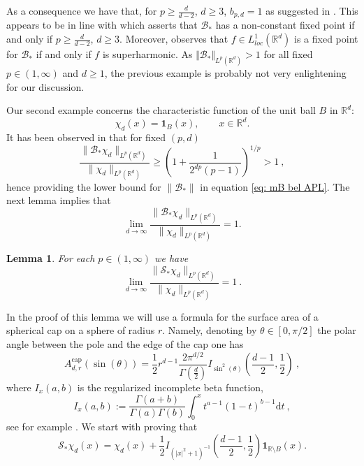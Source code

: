\documentclass[a4paper, reqno]{amsart}
\newtheorem{lemma}[thm]{Lemma}
\theoremstyle{definition}
\newcommand{\R}{{\mathbb R}}
\newcommand{\dd}{{\mathrm d}}
\newcommand{\mB}{\mathcal{B}}
\begin{document}
As a consequence we have that, for $p\geq \frac{d}{d-2}$, $d\geq 3$, $b_{p,d}=1$ as suggested in \cite{DSS}.  This appears to be in line with \cite[Theorem~1]{K01} which asserts that $\mB_\ast$ has a non-constant fixed point if and only if $p\geq \frac{d}{d-2}$, $d\geq 3$. Moreover, \cite[Remark~1]{K01} observes that $f\in L^1_{loc}(\mathbb{R}^d)$ is a fixed point for $\mB_\ast$ if and only if $f$ is superharmonic.
As $\Vert\mathcal{B}_\ast \Vert_{L^p(\mathbb{R}^d)}>1$ for all fixed $p\in (1,\infty)$ and $d\geq 1$, the previous example is probably not very enlightening for our discussion. 

 Our second example concerns the characteristic function of the unit ball $B$ in $\R^d:$ 
 \[\chi_d(x)=\mathbf{1}_{B}(x),\qquad x\in \R^d.\] It has been observed in \cite[Remark 2.9]{APL} that for fixed $(p,d)$
\begin{equation*}
\frac{\|\mB_{*}\chi_d\|_{L^p(\R^d)}}{\|\chi_d \|_{L^p(\R^d)}}\ge \left(1+\frac{1}{2^{dp}(p-1)}\right)^{1/p} >1~,
\end{equation*}
hence providing the lower bound for $\|\mathcal{B}_\ast\|$ in equation \eqref{eq: mB bel APL}. The next lemma implies that
\[
\lim_{d\to \infty} \frac{\|\mB_{*}\chi_d\|_{L^p(\R^d)}}{\|\chi_d \|_{L^p(\R^d)}}=1.
\]
\begin{lemma}
\label{lem: spher ball}
   For each $p\in(1,\infty)$ we have
    $$\lim_{d\rightarrow\infty}\frac{\|\mathcal{S}_\ast \chi_d\|_{L^p(\R^d)}}{\|\chi_d\|_{L^p(\R^d)}}=1~.$$
\end{lemma}
In the proof of this lemma we will use a formula for the surface area of a spherical cap on a sphere of radius $r.$ Namely, denoting by $\theta\in[0,\pi/2]$  the polar angle between the pole and the edge of the cap one has
\begin{equation}
\label{eq: Adr form}
A_{d,r}^{\text{cap}}(\sin(\theta))=\frac{1}{2}r^{d-1}\frac{2\pi^{d/2}}{\Gamma(\tfrac{d}{2})}I_{\sin^2(\theta)}\left(\frac{d-1}{2},\frac{1}{2}\right)~,\end{equation}
where $I_x(a,b)$ is the regularized incomplete beta function,
$$I_x(a,b):=\frac{\Gamma(a+b)}{\Gamma(a)\Gamma(b)}\int_0^x t^{a-1}(1-t)^{b-1}\dd t~,$$
see for example \cite{L11}.
We start with proving that 
\begin{equation}
\label{eq: S on chid}
\mathcal{S}_\ast \chi_d(x)= \chi_d(x)+\frac{1}{2} I_{(|x|^2+1)^{-1}}\left(\frac{d-1}{2},\frac{1}{2}\right)
\mathbf{1}_{\mathbb{R}\setminus B}(x).
\end{equation}
\end{document}
